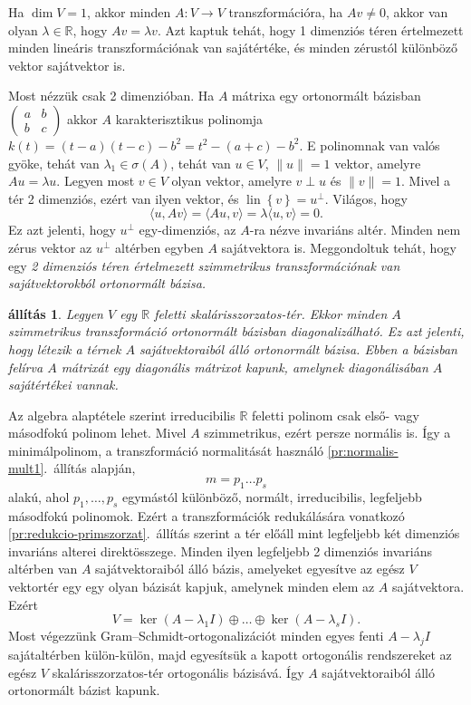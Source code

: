 \documentclass[9pt, a4paper, showtrims]{memoir}
\makeatletter
\renewenvironment{proof}[1][\proofname]
    {\par\pushQED{\qed}%
    \normalfont \topsep6\p@\@plus6\p@\relax
    \trivlist
    \item[\hskip\labelsep
        \itshape
    #1\@addpunct{:}]\ignorespaces}
    {\popQED\endtrivlist\@endpefalse}
\theoremstyle{plain}
\newtheorem{proposition}{állítás}[chapter]
\theoremstyle{remark}
\theoremstyle{definition}
\DeclareMathOperator{\lin}{lin}
\newcommand{\ip}[2]{\langle#1,#2\rangle}
\makeatother
\begin{document}
Ha $\dim V=1$, akkor minden $A:V\to V$ transzformációra, ha $Av\neq 0$, akkor van olyan $\lambda\in\mathbb{R}$,
hogy $Av=\lambda v$. Azt kaptuk tehát, hogy 1 dimenziós téren értelmezett minden lineáris transzformációnak
van sajátértéke, és minden zérustól különböző vektor sajátvektor is.

Most nézzük csak 2 dimenzióban.
Ha $A$ mátrixa egy ortonormált bázisban 
\begin{math}
    \begin{pmatrix}
        a&b\\b&c
    \end{pmatrix}
\end{math}
akkor $A$ karakterisztikus polinomja $k\left( t \right)=\left( t-a \right)\left( t-c \right)-b^2=t^2-\left( a+c \right)-b^2.$
E polinomnak van valós gyöke, tehát van $\lambda_1\in\sigma\left( A \right)$,
tehát van $u\in V$, $\|u\|=1$ vektor, amelyre $Au=\lambda u.$
Legyen most $v\in V$ olyan vektor, amelyre $v\perp u$ és $\|v\|=1$. 
Mivel a tér 2 dimenziós, ezért van ilyen vektor, és $\lin\left\{ v \right\}=u^\perp$.
Világos, hogy 
\[
    \ip{u}{Av}
    =
    \ip{Au}{v}
    =
    \lambda\ip{u}{v}
    =0.
\]
Ez azt jelenti, hogy $u^\perp$ egy-dimenziós, az $A$-ra nézve invariáns altér.
Minden nem zérus vektor az $u^\perp$ altérben egyben $A$ sajátvektora is.
Meggondoltuk tehát, hogy egy 
\emph{
    2 dimenziós téren értelmezett szimmetrikus transzformációnak van sajátvektorokból ortonormált bázisa.
}
\begin{proposition}
    Legyen $V$ egy $\mathbb{R}$ feletti skalárisszorzatos-tér.
    Ekkor minden $A$ szimmetrikus transzformáció ortonormált bázisban diagonalizálható.
    Ez azt jelenti, hogy létezik a térnek $A$ sajátvektoraiból álló ortonormált bázisa.
    Ebben a bázisban felírva $A$ mátrixát egy diagonális mátrixot kapunk,
    amelynek diagonálisában $A$ sajátértékei vannak.
\end{proposition}
\begin{proof}
    Az algebra alaptétele szerint irreducibilis $\mathbb{R}$ feletti polinom
    csak első- vagy másodfokú polinom lehet.
    Mivel $A$ szimmetrikus, ezért persze normális is.
    Így a minimálpolinom, a transzformáció normalitását használó \ref{pr:normalis-mult1}.~állítás alapján,
    \[
        m=p_1\dots p_s
    \]
    alakú, ahol $p_1,\dots,p_s$ egymástól különböző, normált, irreducibilis, legfeljebb másodfokú polinomok.
    Ezért a transzformációk redukálására vonatkozó \ref{pr:redukcio-primszorzat}.~állítás szerint
    a tér előáll mint legfeljebb két dimenziós invariáns alterei direktösszege.
    Minden ilyen legfeljebb 2 dimenziós invariáns altérben van $A$ sajátvektoraiból álló bázis,
    amelyeket egyesítve az egész $V$ vektortér egy egy olyan bázisát kapjuk, 
    amelynek minden elem az $A$ sajátvektora.
    Ezért
    \[
        V=\ker\left( A-\lambda_1I \right)\oplus\dots\oplus\ker\left( A-\lambda_sI \right).
    \]
    Most végezzünk Gram--Schmidt-ortogonalizációt 
    minden egyes fenti $A-\lambda_jI$ sajátaltérben külön-külön,
    majd egyesítsük a kapott ortogonális rendszereket az egész $V$ skalárisszorzatos-tér ortogonális bázisává.
    Így $A$ sajátvektoraiból álló ortonormált bázist kapunk.
\end{proof}
\end{document}
